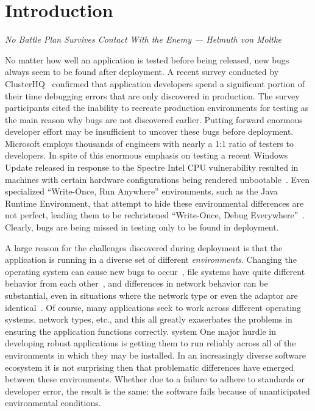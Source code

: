 \section{Introduction}

\textit{No Battle Plan Survives Contact With the Enemy --- Helmuth von Moltke}

No matter how well an application is tested before being released, new 
bugs always seem to be found after deployment.
A recent survey conducted by
ClusterHQ~\cite{ClusterHQSurvey} confirmed that application developers
spend a significant portion of their time debugging errors that are only discovered
in production.  The survey participants cited the inability to
recreate production environments for testing as the main reason why
bugs are not discovered earlier.
Putting forward enormous developer effort
may be insufficient to uncover
these bugs before deployment.
Microsoft employs thousands of engineers with nearly a 1:1 ratio of testers to
developers\cite{Page2009}.
In spite of this enormous emphasis on testing a recent Windows Update released
in response to the Spectre Intel CPU vulnerability resulted in machines with
certain hardware configurations being rendered unbootable~\cite{kb4056892}.
Even specialized ``Write-Once, Run Anywhere'' environments, such as the Java
Runtime Environment, that attempt to hide these environmental differences are
not perfect, leading them to be rechristened ``Write-Once, Debug
Everywhere''~\cite{WODE}.
Clearly, bugs are
being missed in testing only to be found in deployment.

A large reason for the challenges discovered during deployment is that the 
application is running in a diverse set of different \emph{environments}.  
Changing the operating system can cause new bugs to occur~\cite{LinuxGlibcChanges}, file
systems have quite different behavior from each other~\cite{EXT4Layout}\cite{AppleHFS}, and differences
in network behavior can be substantial, even in situations where the network
type or even the adaptor are identical~\cite{vbox}.  Of course, many applications
seek to work across different operating systems, network types, etc., and this
all greatly exaserbates the problems in ensuring the application functions
correctly.
system
One major hurdle in developing robust applications is getting them to
run reliably across all of the environments in which they may be
installed.  In an increasingly diverse software ecosystem it is not
surprising then that problematic differences have emerged between these
environments.  Whether due to a failure to adhere to 
standards or developer error, the result is the same: the software 
fails because of unanticipated environmental conditions.

